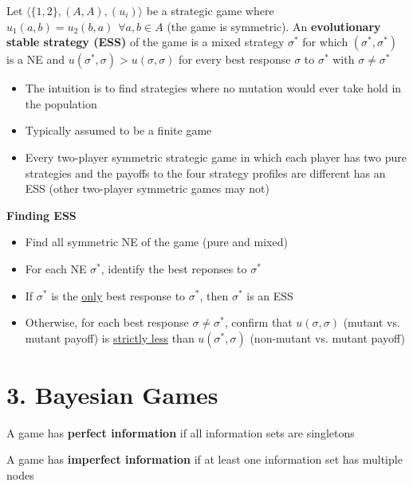 \documentclass{report}
\renewcommand{\chaptermark}[1]{\markboth{#1}{}}
\newcommand{\FlowerSmall}{\mbox{\raisebox{-1pt}{\small\EightFlowerPetalRemoved}}} %
\begin{document}
Let $\langle \{1,2\},(A,A),(u_i) \rangle$ be a strategic game where $u_1(a,b) = u_2(b,a) \hspace{5pt} \forall a,b \in A$ (the game is symmetric). An \textbf{evolutionary stable strategy (ESS)} of the game is a mixed strategy $\sigma^*$ for which $(\sigma^*,\sigma^*)$ is a NE and $u(\sigma^*,\sigma) > u(\sigma,\sigma)$ for every best response $\sigma$ to $\sigma^*$ with $\sigma \neq \sigma^*$
\begin{itemize}
	\item The intuition is to find strategies where no mutation would ever take hold in the population
	\item Typically assumed to be a finite game
	\item Every two-player symmetric strategic game in which each player has two pure strategies and the payoffs to the four strategy profiles are different has an ESS (other two-player symmetric games may not)
\end{itemize}

\bigskip
\begin{mdframed}
	\medskip
	\begin{center} \textbf{{\large Finding ESS}} \end{center}
	\begin{itemize}[label=\FlowerSmall]
		\item Find all symmetric NE of the game (pure and mixed)
		\item For each NE $\sigma^*$, identify the best reponses to $\sigma^*$
		\item If $\sigma^*$ is the \underline{only} best response to $\sigma^*$, then $\sigma^*$ is an ESS
		\item Otherwise, for each best response $\sigma \neq \sigma^*$, confirm that $u(\sigma,\sigma)$ (mutant vs. mutant payoff) is \underline{strictly less} than $u(\sigma^*,\sigma)$ (non-mutant vs. mutant payoff)
	\end{itemize}
	\smallskip
\end{mdframed}
\bigskip

\chapter*{3. Bayesian Games}
\thispagestyle{fancy}
\chaptermark{3. Bayesian Games} \bigskip

A game has \textbf{perfect information} if all information sets are singletons \bigskip

A game has \textbf{imperfect information} if at least one information set has multiple nodes \bigskip
\end{document}
